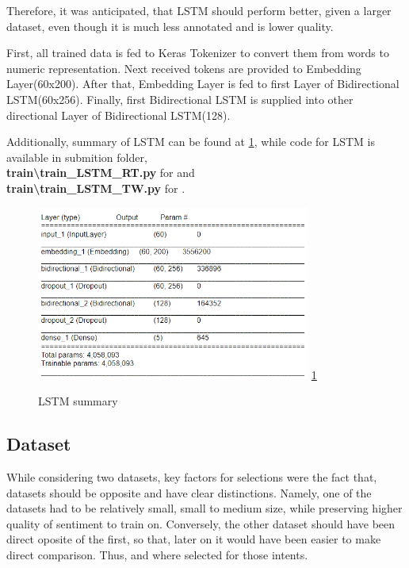 \documentclass[conference]{IEEEtran}
\begin{document}
		Therefore, it was anticipated, that LSTM should perform better, given a larger dataset, even though it is much less annotated and is lower quality.
		
		First, all trained data is fed to Keras Tokenizer to convert them from words to numeric representation. Next received tokens are provided to Embedding Layer(60x200). After that, Embedding Layer is fed to first Layer of Bidirectional LSTM(60x256). Finally, first Bidirectional LSTM is supplied into other directional Layer of Bidirectional LSTM(128).
		
		Additionally, summary of LSTM can be found at \ref{figure:lstm}, while code for LSTM is available in submition folder, \textbf{\\train\textbackslash train\_LSTM\_RT.py} for \RT and \textbf{\\train\textbackslash train\_LSTM\_TW.py} for \TW.
		
		\begin{figure}
			\centering
			\includegraphics[width=9cm]{summary_lstm.png}
			\label{figure:lstm}
			\ref{figure:lstm}
			\caption{LSTM summary}
		\end{figure}

	\subsection{Dataset}
		While considering two datasets, key factors for selections were the fact that, datasets should be opposite and have clear distinctions. Namely, one of the datasets had to be relatively small, small to medium size, while preserving higher quality of sentiment to train on. Conversely, the other dataset should have been direct oposite of the first, so that, later on it would have been easier to make direct comparison. Thus, \RT\cite{dataset:RT} and \TW\cite{dataset:TW} where selected for those intents.
		
		\subsubsection{\RT\cite{dataset:RT}}
		
\end{document}
